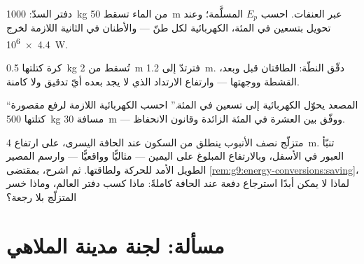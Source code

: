 \begin{exercise}[$\star\star$]\label{exo:g9:energy-conversions:9}
دفتر السدّ: \qty{1000}{kg} من الماء تسقط \qty{50}{m} عبر
العنفات. احسب $E_p$ المسلَّمة؛ وعند تحويل بتسعين في المئة،
 الكهربائية لكل طنّ --- والأطنان في الثانية اللازمة لخرج
\qty{4.4e6}{W}.
\end{exercise}

\begin{exercise}[$\star\star$]\label{exo:g9:energy-conversions:10}
كرة كتلتها \qty{0.5}{kg} تُسقط من \qty{2}{m} فترتدّ إلى
\qty{1.2}{m}. دقّق النطّة: الطاقتان قبل وبعد،  القشطة
ووجهتها --- وارتفاع الارتداد الذي لا يجد بعده أيّ تدقيق  ولا كامنة.
\end{exercise}

\begin{exercise}[$\star\star$]\label{exo:g9:energy-conversions:11}
``المصعد يحوّل  الكهربائية إلى   تسعين
في المئة.'' احسب  الكهربائية اللازمة لرفع مقصورة كتلتها
\qty{500}{kg} مسافة \qty{30}{m} --- ووفّق بين العشرة في المئة
الزائدة وقانون الانحفاظ.
\end{exercise}

\begin{exercise}[$\star\star\star$]\label{exo:g9:energy-conversions:12}
متزلّج نصف الأنبوب ينطلق من السكون عند الحافة اليسرى، على
ارتفاع \qty{4}{m}. تنبّأ  العبور في الأسفل، وبالارتفاع
المبلوغ على اليمين --- مثاليًّا وواقعيًّا --- وارسم المصير
الطويل الأمد للحركة ولطاقتها. ثم اشرح، بمقتضى
\cref{rem:g9:energy-conversions:saving}، لماذا لا يمكن أبدًا
استرجاع دفعة عند الحافة كاملةً: ماذا كسب دفتر العالم، وماذا
خسر المتزلّج بلا رجعة؟
\end{exercise}

\section{مسألة: لجنة مدينة الملاهي}

